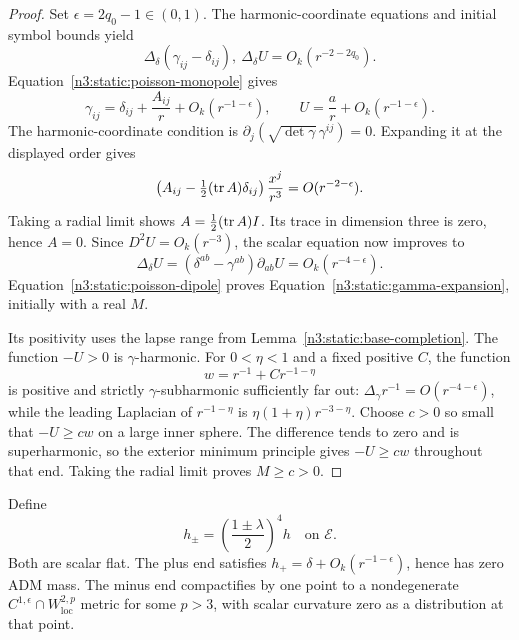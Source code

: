\begin{proof}
Set \(\epsilon=2q_0-1\in(0,1)\).
The harmonic-coordinate equations and initial symbol bounds yield
\[
\Delta_\delta(\gamma_{ij}-\delta_{ij}),
\ \Delta_\delta U=O_k(r^{-2-2q_0}).
\]
Equation~\eqref{n3:static:poisson-monopole} gives
\[
\gamma_{ij}=\delta_{ij}+\frac{A_{ij}}r
 +O_k(r^{-1-\epsilon}),\qquad
U=\frac ar+O_k(r^{-1-\epsilon}).
\]
The harmonic-coordinate condition is
\(\partial_j(\sqrt{\det\gamma}\,\gamma^{ij})=0\).
Expanding it at the displayed order gives
\[
\left(A_{ij}-\tfrac12(\operatorname{tr} A)\delta_{ij}\right)
\frac{x^j}{r^3}=O(r^{-2-\epsilon}).
\]
Taking a radial limit shows \(A=\tfrac12(\operatorname{tr} A)I\).
Its trace in dimension three is zero, hence \(A=0\).
Since \(D^2U=O_k(r^{-3})\), the scalar equation now improves to
\[
\Delta_\delta U
=(\delta^{ab}-\gamma^{ab})\partial_{ab}U
=O_k(r^{-4-\epsilon}).
\]
Equation~\eqref{n3:static:poisson-dipole} proves
Equation~\eqref{n3:static:gamma-expansion}, initially with a real \(M\).

Its positivity uses the lapse range from
Lemma~\ref{n3:static:base-completion}.
The function \(-U>0\) is \(\gamma\)-harmonic.
For \(0<\eta<1\) and a fixed positive \(C\), the function
\[
w=r^{-1}+Cr^{-1-\eta}
\]
is positive and strictly \(\gamma\)-subharmonic sufficiently far out:
\(\Delta_\gamma r^{-1}=O(r^{-4-\epsilon})\), while the leading
Laplacian of \(r^{-1-\eta}\) is
\(\eta(1+\eta)r^{-3-\eta}\).
Choose \(c>0\) so small that \(-U\geq cw\) on a large inner sphere.
The difference tends to zero and is superharmonic, so the exterior
minimum principle gives \(-U\geq cw\) throughout that end.
Taking the radial limit proves \(M\geq c>0\).
\end{proof}

\begin{lemma}
\label{n3:static:conformal-completion}
Define
\[
h_\pm=\left(\frac{1\pm\lambda}{2}\right)^4h
\quad\text{on }\mathcal E.
\]
Both are scalar flat. The plus end satisfies
\(h_+=\delta+O_k(r^{-1-\epsilon})\), hence has zero ADM mass.
The minus end compactifies by one point to a nondegenerate
\(C^{1,\epsilon}\cap W^{2,p}_{\mathrm{loc}}\) metric for some
\(p>3\), with scalar curvature zero as a distribution at that point.
\end{lemma}

